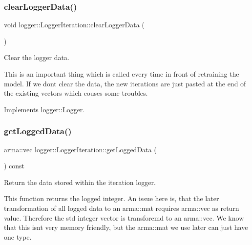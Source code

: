 \subsubsection{\texorpdfstring{clear\+Logger\+Data()}{clearLoggerData()}}
{\footnotesize\ttfamily void logger\+::\+Logger\+Iteration\+::clear\+Logger\+Data (\begin{DoxyParamCaption}{ }\end{DoxyParamCaption})\hspace{0.3cm}{\ttfamily [virtual]}}



Clear the logger data. 

This is an important thing which is called every time in front of retraining the model. If we don\textquotesingle{}t clear the data, the new iterations are just pasted at the end of the existing vectors which couses some troubles. 

Implements \mbox{\hyperlink{classlogger_1_1_logger_a8c68db2430fa84b67528bfa6ae45a516}{logger\+::\+Logger}}.

\mbox{\label{classlogger_1_1_logger_iteration_a2d0404feb799850420874612a435f3da}} 
\subsubsection{\texorpdfstring{get\+Logged\+Data()}{getLoggedData()}}
{\footnotesize\ttfamily arma\+::vec logger\+::\+Logger\+Iteration\+::get\+Logged\+Data (\begin{DoxyParamCaption}{ }\end{DoxyParamCaption}) const\hspace{0.3cm}{\ttfamily [virtual]}}



Return the data stored within the iteration logger. 

This function returns the logged integer. An issue here is, that the later transformation of all logged data to an {\ttfamily arma\+::mat} requires {\ttfamily arma\+::vec} as return value. Therefore the std integer vector is transforemd to an {\ttfamily arma\+::vec}. We know that this isn\textquotesingle{}t very memory friendly, but the {\ttfamily arma\+::mat} we use later can just have one type.

